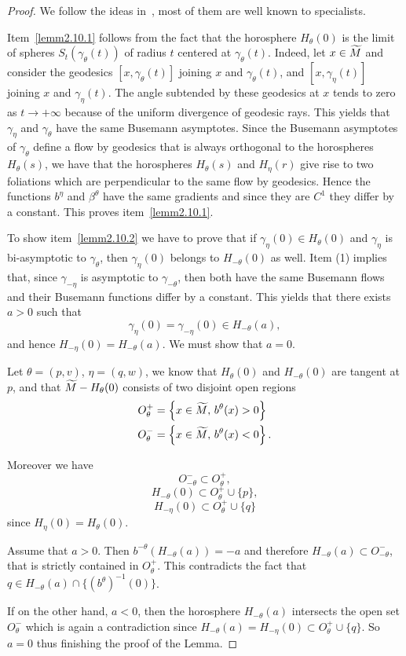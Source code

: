 \documentclass[10pt]{amsart}
\theoremstyle{definition}
\let\oldtilde\tilde
\renewcommand*{\tilde}[1]{\mathchoice{\widetilde{#1}}{\widetilde{#1}}{\oldtilde{#1}}{\oldtilde{#1}}}
\begin{document}
\begin{proof}
We follow the ideas in~\cite{kn:Ruggiero-Asterisque}, most of them are well known to specialists.

Item~\eqref{lemm2.10.1} follows from the fact that the horosphere $H_{\theta}(0)$ is the limit of spheres $S_{t}(\gamma_{\theta}(t))$ of radius $t$ centered at $\gamma_{\theta}(t)$. Indeed, let $ x \in \tilde{M}$ and consider the geodesics $[x, \gamma_{\theta}(t)]$ joining $x$ and $\gamma_{\theta}(t)$, and $[x,\gamma_{\eta}(t)]$ joining $x$ and $\gamma_{\eta}(t)$. The angle subtended by these geodesics at $x$ tends to zero as $t \rightarrow +\infty$ because of the uniform divergence of geodesic rays. This yields that $\gamma_{\eta}$ and $\gamma_{\theta}$ have the same Busemann asymptotes. Since the Busemann asymptotes of $\gamma_{\theta}$ define a flow by geodesics that is always orthogonal to the horospheres $H_{\theta}(s)$, we have that the horospheres $H_{\theta}(s)$ and $H_{\eta}(r)$ give rise to two foliations which are perpendicular to the same flow by geodesics. Hence the functions $b^{\eta}$ and $\beta^{\theta}$ have the same gradients and since they are $C^{1}$ they differ by a constant. This proves item~\eqref{lemm2.10.1}.

To show item~\eqref{lemm2.10.2} we have to prove that if $\gamma_{\eta}(0) \in H_{\theta}(0)$ and $\gamma_{\eta}$ is bi-asymptotic to $\gamma_{\theta}$, then $\gamma_{\eta}(0)$ belongs to $H_{-\theta}(0)$ as well. Item (1) implies that, since $\gamma_{-\eta}$ is asymptotic to $\gamma_{-\theta}$, then both have the same Busemann flows and their Busemann functions differ by a constant. This yields that there exists $a>0$ such that
\[
\gamma_{\eta}(0) = \gamma_{-\eta}(0) \in H_{-\theta}(a),
\]
and hence $H_{-\eta}(0) = H_{-\theta}(a)$. We must show that $a =0$.

Let $\theta = (p,v)$, $\eta = (q, w)$, we know that $H_{\theta}(0)$ and $H_{-\theta}(0)$ are tangent at $p$, and that $\tilde{M}- H_{\theta}(0)$ consists of two disjoint open regions
\begin{align*}
O_{\theta}^{+} &= \left\{x\in \tilde{M}, \,b^{\theta}(x) >0\right\}
\\
O_{\theta}^{-} &= \left\{x\in \tilde{M}, \,b^{\theta}(x) <0\right\}.
\end{align*}

Moreover we have
\[
O_{-\theta}^{-} \subset O_{\theta}^{+},
\]
\[
H_{-\theta}(0) \subset O_{\theta}^{+} \cup \{p \},
\]
\[
H_{-\eta}(0) \subset O_{\theta}^{+} \cup \{q\}
\]
since $H_{\eta}(0) = H_{\theta}(0)$.

Assume that $a>0$. Then $b^{-\theta}(H_{-\theta}(a)) =-a$ and therefore $H_{-\theta}(a) \subset O_{-\theta}^{-}$, that is strictly contained in $O_{\theta}^{+}$. This contradicts the fact that $q \in H_{-\theta}(a) \cap \{ (b^{\theta})^{-1}(0) \}$.

If on the other hand, $a<0$, then the horosphere $H_{-\theta}(a)$ intersects the open set $O_{\theta}^{-}$ which is again a contradiction since $H_{-\theta}(a) = H_{-\eta}(0) \subset O_{\theta}^{+} \cup \{q\}$. So $a=0$ thus finishing the proof of the Lemma.
\end{proof}
\end{document}
